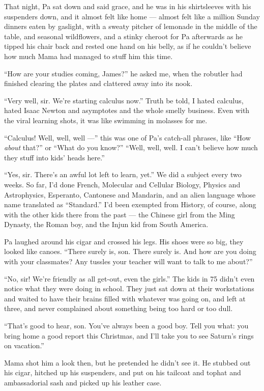 That night, Pa sat down and said grace, and he was in his
shirtsleeves with his suspenders down, and it almost felt like home
--- almost felt like a million Sunday dinners eaten by gaslight,
with a sweaty pitcher of lemonade in the middle of the table, and
seasonal wildflowers, and a stinky cheroot for Pa afterwards as he
tipped his chair back and rested one hand on his belly, as if he
couldn't believe how much Mama had managed to stuff him this time.

``How are your studies coming, James?'' he asked me, when the
robutler had finished clearing the plates and clattered away into
its nook.

``Very well, sir. We're starting calculus now.'' Truth be told, I
hated calculus, hated Isaac Newton and asymptotes and the whole
smelly business. Even with the viral learning shots, it was like
swimming in molasses for me.

``Calculus! Well, well, well ---'' this was one of Pa's catch-all
phrases, like ``How \emph{about} that?'' or ``What do you know?''
``Well, well, well. I can't believe how much they stuff into kids' heads here.''

``Yes, sir. There's an awful lot left to learn, yet.'' We did a
subject every two weeks. So far, I'd done French, Molecular and
Cellular Biology, Physics and Astrophysics, Esperanto, Cantonese
and Mandarin, and an alien language whose name translated as
``Standard.'' I'd been exempted from History, of course, along with
the other kids there from the past --- the Chinese girl from the
Ming Dynasty, the Roman boy, and the Injun kid from South America.

Pa laughed around his cigar and crossed his legs. His shoes were so
big, they looked like canoes.
``There surely is, son. There surely is. And how are you doing with your 
classmates? Any tussles your teacher will want to talk to me about?''

``No, sir! We're friendly as all get-out, even the girls.'' The
kids in 75 didn't even notice what they were doing in school. They
just sat down at their workstations and waited to have their brains
filled with whatever was going on, and left at three, and never
complained about something being too hard or too dull.

``That's good to hear, son. You've always been a good boy. Tell you what: you 
bring home a good report this Christmas, and I'll take you to see Saturn's 
rings on vacation.''

Mama shot him a look then, but he pretended he didn't see it. He
stubbed out his cigar, hitched up his suspenders, and put on his
tailcoat and tophat and ambassadorial sash and picked up his
leather case.

